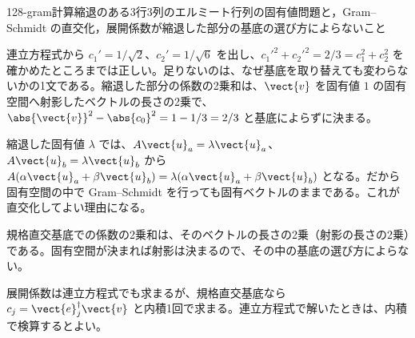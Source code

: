 \documentclass[uplatex,dvipdfmx,a4paper,11pt]{jsarticle}
\begin{document}
\begin{mondai}{128-gram}{計算}{縮退のある3行3列のエルミート行列の固有値問題と，Gram--Schmidt の直交化，展開係数が縮退した部分の基底の選び方によらないこと}
\begin{kotaeran}
   連立方程式から $c_{1}'=1/\sqrt{2}$、$c_{2}'=1/\sqrt{6}$ を出し、$c_{1}'^{2}+c_{2}'^{2}=2/3=c_{1}^{2}+c_{2}^{2}$ を確かめたところまでは正しい。足りないのは、なぜ基底を取り替えても変わらないかの1文である。縮退した部分の係数の2乗和は、$\vect{v}$ を固有値 $1$ の固有空間へ射影したベクトルの長さの2乗で、$\abs{\vect{v}}^{2}-\abs{c_{0}}^{2}=1-1/3=2/3$ と基底によらずに決まる。
\end{kotaeran}
\begin{rikai}
  \item 縮退した固有値 $\lambda$ では、$A\vect{u}_{a}=\lambda\vect{u}_{a}$、$A\vect{u}_{b}=\lambda\vect{u}_{b}$ から $A(\alpha\vect{u}_{a}+\beta\vect{u}_{b})=\lambda(\alpha\vect{u}_{a}+\beta\vect{u}_{b})$ となる。だから固有空間の中で Gram--Schmidt を行っても固有ベクトルのままである。これが直交化してよい理由になる。
  \item 規格直交基底での係数の2乗和は、そのベクトルの長さの2乗（射影の長さの2乗）である。固有空間が決まれば射影は決まるので、その中の基底の選び方によらない。
  \item 展開係数は連立方程式でも求まるが、規格直交基底なら $c_{j}=\vect{e}_{j}^{\dagger}\vect{v}$ と内積1回で求まる。連立方程式で解いたときは、内積で検算するとよい。
\end{rikai}
\end{mondai}
\end{document}
